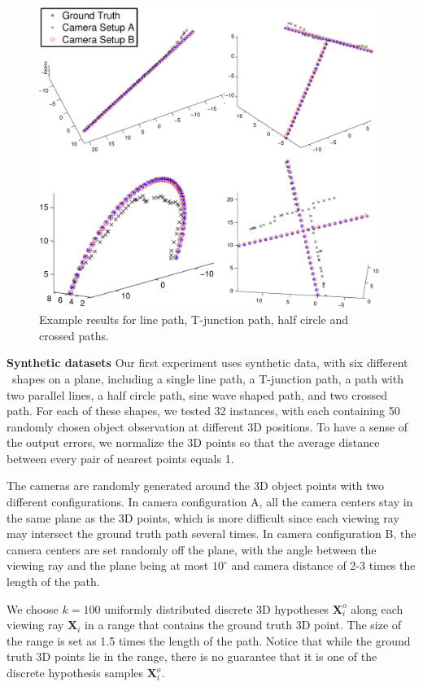 \begin{figure}
\centering
    \includegraphics[width=0.99\textwidth]{chapter4/resource/allfig_2.pdf}
\caption{Example results for line path, T-junction path, half circle and crossed paths.}
\label{fig:synthetic}
\end{figure}

\textbf{Synthetic datasets} Our first experiment uses synthetic data, with six different \oct~shapes on a plane, including a single line path, a T-junction path, a path with two parallel lines, a half circle path, sine wave shaped path, and two crossed path. For each of these shapes, we tested 32 instances, with each containing 50 randomly chosen object observation at different 3D positions. To have a sense of the output errors, we normalize the 3D points so that the average distance between every pair of nearest points equals 1. 

The cameras are randomly generated around the 3D object points with two different configurations. In camera configuration A, all the camera centers stay in the same plane as the 3D points, which is more difficult since each viewing ray may intersect the ground truth path several times. In camera configuration B, the camera centers are set randomly off the plane, with the angle between the viewing ray and the plane being at most $10^\circ$ and camera distance of 2-3 times the length of the path. 

We choose $k=100$ uniformly distributed discrete 3D hypotheses $\mathbf{X}_i^o$  along each viewing ray $\mathbf{X}_i$ in a range that contains the ground truth 3D point. The size of the range is set as 1.5 times the length of the path. Notice that while the ground truth 3D points lie in the range, there is no guarantee that it is one of the discrete hypothesis samples $\mathbf{X}_i^o$. %

